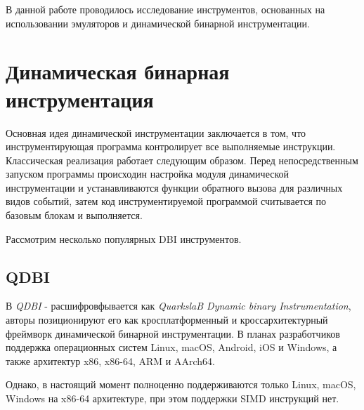 В данной работе проводилось исследование инструментов, основанных на использовании эмуляторов и динамической бинарной инструментации.


\section{Динамическая бинарная инструментация}

Основная идея динамической инструментации заключается в том, что инструментирующая программа контролирует все выполняемые инструкции. Классическая реализация работает следующим образом. Перед непосредственным запуском программы происходин настройка модуля динамической инструментации и устанавливаются функции обратного вызова для различных видов событий, затем код инструментируемой программой считывается по базовым блокам и выполняется.

Рассмотрим несколько популярных DBI инструментов.

\subsection{QDBI}

В \cite{QDBI} \emph{QDBI} - расшифровфывается как \emph{QuarkslaB Dynamic binary Instrumentation}, авторы позиционируют его как кросплатформенный и кроссархитектурный фреймворк динамической бинарной инструментации. В планах разработчиков поддержка операционных систем Linux, macOS, Android, iOS и Windows, а также архитектур  x86, x86-64, ARM и AArch64.

Однако, в настоящий момент полноценно поддерживаются только Linux, macOS, Windows на x86-64 архитектуре, при этом поддержки SIMD инструкций нет.

